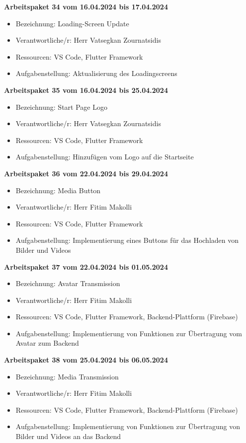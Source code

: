 \textbf{Arbeitspaket 34 vom 16.04.2024 bis 17.04.2024}
\begin{itemize}[itemsep=0pt]
    \item{Bezeichnung: Loading-Screen Update} 
	\item{Verantwortliche/r: Herr Vatsegkan Zournatsidis} 
	\item{Ressourcen: VS Code, Flutter Framework} 
    \item{Aufgabenstellung: Aktualisierung des Loadingscreens}
\end{itemize} 

\textbf{Arbeitspaket 35 vom 16.04.2024 bis 25.04.2024}
\begin{itemize}[itemsep=0pt]
    \item{Bezeichnung: Start Page Logo} 
	\item{Verantwortliche/r: Herr Vatsegkan Zournatsidis} 
	\item{Ressourcen: VS Code, Flutter Framework} 
    \item{Aufgabenstellung: Hinzufügen vom Logo auf die Startseite}
\end{itemize}

\textbf{Arbeitspaket 36 vom 22.04.2024 bis 29.04.2024}
\begin{itemize}[itemsep=0pt]
    \item{Bezeichnung: Media Button} 
	\item{Verantwortliche/r: Herr Fitim Makolli} 
	\item{Ressourcen: VS Code, Flutter Framework} 
    \item{Aufgabenstellung: Implementierung eines Buttons für das Hochladen von Bilder und Videos}
\end{itemize}

\textbf{Arbeitspaket 37 vom 22.04.2024 bis 01.05.2024}
\begin{itemize}[itemsep=0pt]
    \item{Bezeichnung: Avatar Transmission} 
	\item{Verantwortliche/r: Herr Fitim Makolli} 
	\item{Ressourcen: VS Code, Flutter Framework, Backend-Plattform (Firebase)}
    \item{Aufgabenstellung: Implementierung von Funktionen zur Übertragung vom Avatar zum Backend} 
\end{itemize} 

\textbf{Arbeitspaket 38 vom 25.04.2024 bis 06.05.2024}
\begin{itemize}[itemsep=0pt]
    \item{Bezeichnung: Media Transmission} 
	\item{Verantwortliche/r: Herr Fitim Makolli} 
	\item{Ressourcen: VS Code, Flutter Framework, Backend-Plattform (Firebase)}
    \item{Aufgabenstellung: Implementierung von Funktionen zur Übertragung von Bilder und Videos an das Backend} 
\end{itemize}


